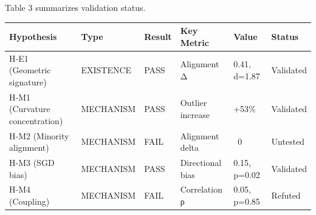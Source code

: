 Table 3 summarizes validation status.

\begin{table}[htbp]
\centering
\begin{tabular}{llllll}
\toprule
Hypothesis & Type & Result & Key Metric & Value & Status \\
\midrule
H-E1 (Geometric signature) & EXISTENCE & PASS & Alignment Δ & 0.41, d=1.87 & Validated \\
H-M1 (Curvature concentration) & MECHANISM & PASS & Outlier increase & +53\% & Validated \\
H-M2 (Minority alignment) & MECHANISM & FAIL & Alignment delta & ~0 & Untested \\
H-M3 (SGD bias) & MECHANISM & PASS & Directional bias & 0.15, p=0.02 & Validated \\
H-M4 (Coupling) & MECHANISM & FAIL & Correlation ρ & 0.05, p=0.85 & Refuted \\
\bottomrule
\end{tabular}
\end{table}
